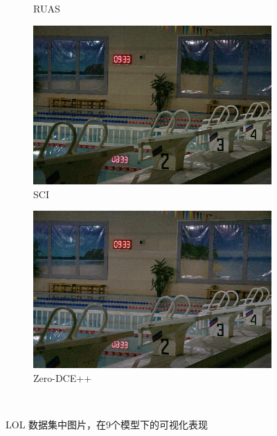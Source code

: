 \documentclass[a4paper]{ctexart}
\begin{document}
\begin{figure}[htb]
\begin{subfigure}{0.19\textwidth}
				\captionsetup{font=scriptsize}
				\caption{RUAS}
				\label{fig: RUAS}
			\end{subfigure}
			\begin{subfigure}{0.19\textwidth}
				\includegraphics[width=\linewidth]{picture/LLIE/Experiment/SCI}
				\captionsetup{font=scriptsize}
				\caption{SCI}
				\label{fig: SCI}
			\end{subfigure}
			\begin{subfigure}{0.19\textwidth}
				\includegraphics[width=\linewidth]{picture/LLIE/Experiment/Zero-DCE++}
				\captionsetup{font=scriptsize}
				\caption{Zero-DCE++}
				\label{fig: Zero-DCE++}
			\end{subfigure}\\
			
			\caption{
				\label{fig: Experiment}
				LOL 数据集中图片，在9个模型下的可视化表现
			}
		\end{figure}
		
\end{document}
